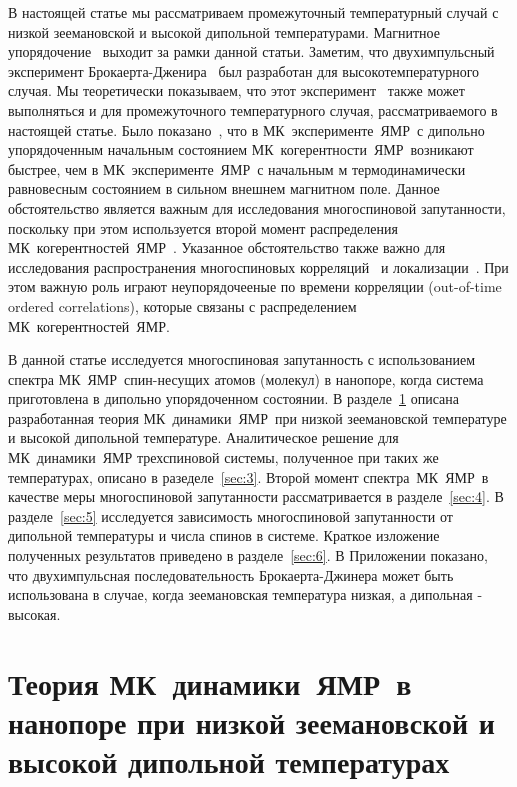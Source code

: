 \documentclass[utf8]{jetp}
\begin{document}
В настоящей статье мы рассматриваем промежуточный температурный случай с низкой зеемановской и высокой дипольной температурами.
Магнитное упорядочение~\cite{Abragam_1982} выходит за рамки данной статьи.
Заметим, что двухимпульсный эксперимент Брокаерта-Дженира~\cite{Jeener_1967} был разработан для высокотемпературного случая.
Мы теоретически  показываем, что этот эксперимент~\cite{Jeener_1967} также может выполняться и для промежуточного температурного случая, рассматриваемого в настоящей статье.
Было показано~\cite{Doronin_2011}, что в МК~эксперименте~ЯМР~с дипольно упорядоченным начальным состоянием МК~когерентности~ЯМР~возникают быстрее,
чем в МК~эксперименте~ЯМР~с начальным м термодинамически равновесным состоянием в сильном внешнем магнитном поле.
Данное обстоятельство является важным для исследования многоспиновой запутанности, поскольку при этом используется  второй момент распределения МК~когерентностей~ЯМР~.
Указанное обстоятельство также важно для исследования распространения многоспиновых корреляций~\cite{Baugh_2001,Baum_1986,S_nchez_2014,Munowitz_1987} и локализации~\cite{Alvarez_2015,Wei_2018}.
При этом важную роль играют неупорядочееные по времени корреляции (out-of-time ordered correlations), которые связаны с распределением МК~когерентностей~ЯМР.

В данной статье исследуется многоспиновая запутанность с использованием спектра МК~ЯМР~спин-несущих атомов (молекул) в нанопоре, когда система приготовлена в дипольно упорядоченном состоянии.
В разделе~\ref{sec:2} описана разработанная теория МК~динамики~ЯМР~при низкой зеемановской температуре и высокой дипольной температуре.
Аналитическое решение для МК~динамики~ЯМР трехспиновой системы, полученное при таких же температурах,  описано в разеделе~\ref{sec:3}.
Второй момент спектра~МК~ЯМР~в качестве меры многоспиновой запутанности рассматривается в разделе~\ref{sec:4}.
В разделе~\ref{sec:5} исследуется зависимость многоспиновой запутанности от дипольной температуры и числа спинов в системе.
Краткое изложение полученных результатов приведено в разделе~\ref{sec:6}.
В Приложении показано, что двухимпульсная последовательность Брокаерта-Джинера может быть использована в случае, когда зеемановская температура низкая, а дипольная - высокая.



\section{Теория МК~динамики~ЯМР~в нанопоре при низкой зеемановской  и высокой дипольной температурах}
\label{sec:2}
\end{document}
